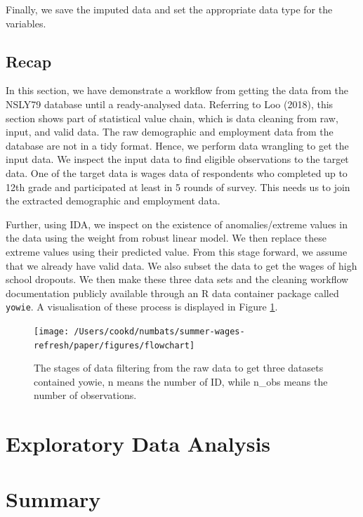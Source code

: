 \documentclass{article}
\begin{document}
Finally, we save the imputed data and set the appropriate data type for the variables.

\hypertarget{recap}{%
\subsection{Recap}\label{recap}}

In this section, we have demonstrate a workflow from getting the data from the NSLY79 database until a ready-analysed data. Referring to Loo (2018), this section shows part of statistical value chain, which is data cleaning from raw, input, and valid data. The raw demographic and employment data from the database are not in a tidy format. Hence, we perform data wrangling to get the input data. We inspect the input data to find eligible observations to the target data. One of the target data is wages data of respondents who completed up to 12th grade and participated at least in 5 rounds of survey. This needs us to join the extracted demographic and employment data.

Further, using IDA, we inspect on the existence of anomalies/extreme values in the data using the weight from robust linear model. We then replace these extreme values using their predicted value.
From this stage forward, we assume that we already have valid data. We also subset the data to get the wages of high school dropouts. We then make these three data sets and the cleaning workflow documentation publicly available through an R data container package called \texttt{yowie}. A visualisation of these process is displayed in Figure \ref{fig:flow-chart}.

\begin{figure}

{\centering \texttt{[image: /Users/cookd/numbats/summer-wages-refresh/paper/figures/flowchart]} 

}

\caption{The stages of data filtering from the raw data to get three datasets contained yowie, n means the number of ID, while n\_obs means the number of observations.}\label{fig:flow-chart}
\end{figure}

\hypertarget{exploratory-data-analysis}{%
\section{Exploratory Data Analysis}\label{exploratory-data-analysis}}

\hypertarget{summary}{%
\section{Summary}\label{summary}}
\end{document}
